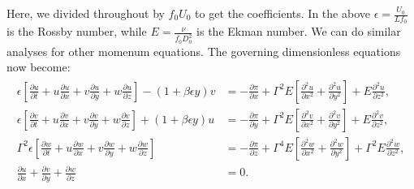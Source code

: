 \documentclass{article}
\newcommand{\pd}[2]{\frac{\partial{#1}}{\partial{#2}}}
\newcommand{\pdd}[2]{\frac{\partial^2{#1}}{\partial{#2}^2}}
\begin{document}
Here, we divided throughout by $f_{0}U_{0}$ to get the coefficients. In the above $\epsilon = \frac{U_{0}}{Lf_{0}}$ is the Rossby number, while $E = \frac{\nu}{f_{0}D_{0}^{2}}$ is the Ekman number. We can do similar analyses for other momenum equations. The governing dimensionless equations now become:
\begin{align}\label{eq:rotating-NS-dimless}
 \begin{split}
  \epsilon \left[\pd{u}{t} + u \pd{u}{x} + v \pd{u}{y} + w\pd{u}{z}\right] - (1 + \beta \epsilon y)v &= -\pd{\pi}{x} + \Gamma^{2}E\left[\pdd{u}{x} + \pdd{u}{y}\right] + E \pdd{u}{z},\\
  \epsilon \left[\pd{v}{t} + u \pd{v}{x} + v \pd{v}{y} + w\pd{v}{z}\right] + (1 + \beta \epsilon y)u &= -\pd{\pi}{y} + \Gamma^{2}E\left[\pdd{v}{x} + \pdd{v}{y}\right] + E \pdd{v}{z},\\
  \Gamma^{2} \epsilon \left[\pd{w}{t} + u \pd{w}{x} + v \pd{w}{y} + w\pd{w}{z} \right] &= - \pd{\pi}{z} + \Gamma^{4}E\left[\pdd{w}{x} + \pdd{w}{y}\right] + \Gamma^{2}E \pdd{w}{z},\\
  \pd{u}{x} + \pd{v}{y} + \pd{w}{z} &= 0.
 \end{split}
\end{align}
\end{document}
